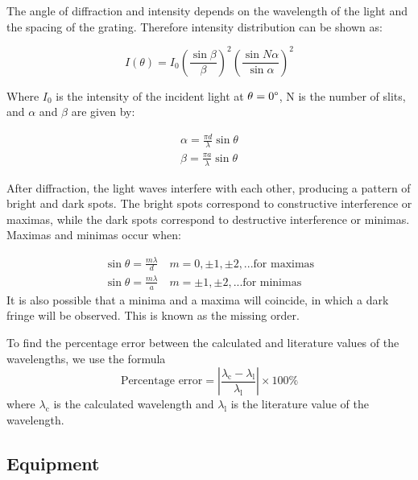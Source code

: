 \documentclass[10pt]{article}
\begin{document}
The angle of diffraction and intensity depends on the wavelength of the light and the spacing of the grating. Therefore intensity distribution can be shown as: 

\begin{equation}
  I(\theta) = I_0 \left( \frac{\sin \beta}{\beta} \right)^2 \left( \frac{\sin N \alpha}{\sin \alpha} \right)^2
\end{equation}

Where $I_0$ is the intensity of the incident light at $\theta = 0\degree$, N is the number of slits, and $\alpha$ and $\beta$ are given by:

\begin{equation}
  \begin{gathered}
    \alpha = \frac{\pi d}{\lambda} \sin \theta \\
    \beta = \frac{\pi a}{\lambda} \sin \theta
  \end{gathered}
\end{equation}

After diffraction, the light waves interfere with each other, producing a pattern of bright and dark spots. The bright spots correspond to constructive interference or maximas, while the dark spots correspond to destructive interference or minimas. Maximas and minimas occur when:

\begin{equation}
  \begin{gathered}
    \sin \theta = \frac{m \lambda}{d} \quad m = 0, \pm 1, \pm 2, ... \text{for maximas}\\
    \sin \theta = \frac{m \lambda}{a} \quad m = \pm 1, \pm 2, ... \text{for minimas}
  \end{gathered}
\end{equation}
It is also possible that a minima and a maxima will coincide, in which a dark fringe will be observed. This is known as the missing order.

To find the percentage error between the calculated and literature values of the wavelengths, we use the formula
\begin{equation}
  \text{Percentage error} = \left| \frac{\lambda_{\text{c}} - \lambda_{\text{l}}}{\lambda_{\text{l}}} \right| \times 100 \%
\end{equation}
where $\lambda_{\text{c}}$ is the calculated wavelength and $\lambda_{\text{l}}$ is the literature value of the wavelength.

\subsection*{Equipment}
\end{document}
